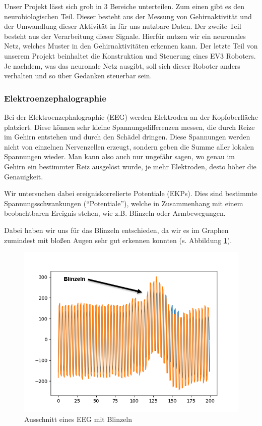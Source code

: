 \documentclass[10pt]{scrartcl}
\begin{document}
	Unser Projekt lässt sich grob in 3 Bereiche unterteilen. Zum einen gibt es den neurobiologischen Teil. Dieser besteht aus der Messung von Gehirnaktivität und der Umwandlung dieser Aktivität in für uns nutzbare Daten. Der zweite Teil besteht aus der Verarbeitung dieser Signale. Hierfür nutzen wir ein neuronales Netz, welches Muster in den Gehirnaktivitäten erkennen kann. Der letzte Teil von unserem Projekt beinhaltet die Konstruktion und Steuerung eines EV3 Roboters. Je nachdem, was das neuronale Netz ausgibt, soll sich dieser Roboter anders verhalten und so über Gedanken steuerbar sein.	

	\subsubsection{Elektroenzephalographie}

	Bei der Elektroenzephalographie (EEG) werden Elektroden an der Kopfoberfläche platziert. Diese können sehr kleine Spannungsdifferenzen messen, die durch Reize im Gehirn entstehen und durch den Schädel dringen. Diese Spannungen werden nicht von einzelnen Nervenzellen erzeugt, sondern geben die Summe aller lokalen Spannungen wieder. Man kann also auch nur ungefähr sagen, wo genau im Gehirn ein bestimmter Reiz ausgelöst wurde, je mehr Elektroden, desto höher die Genauigkeit. \cite{wiki:EEG}

	Wir untersuchen dabei ereigniskorrelierte Potentiale (EKPs). Dies sind bestimmte Spannungsschwankungen (\enquote{Potentiale}), welche in Zusammenhang mit einem beobachtbaren Ereignis stehen, wie z.B. Blinzeln oder Armbewegungen. \cite{Birbaumer2010} \cite{Praktikum}

	Dabei haben wir uns für das Blinzeln entschieden, da wir es im Graphen zumindest mit bloßen Augen sehr gut erkennen konnten (s. Abbildung \ref{EEG-Blinzeln}).

	\begin{figure}[h]
		\includegraphics{pictures/blinzeln_ekp_beispiel_pyplot_annotated.png}
		\caption{Ausschnitt eines EEG mit Blinzeln}
		\label{EEG-Blinzeln}
	\end{figure}
\end{document}
